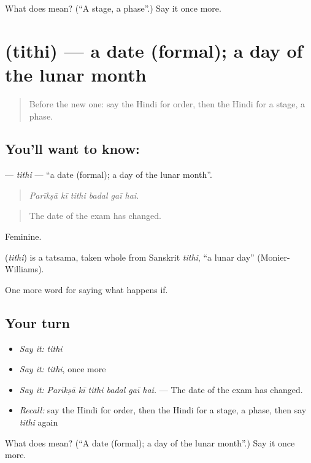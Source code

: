 \begin{tcolorbox}[breakable,colback=teal!4,colframe=teal!35!black,title={Before you move on}]
What does  mean? (\textquotedblleft{}A stage, a phase\textquotedblright{}.) Say it once more.
\end{tcolorbox}
\section[\texorpdfstring{\hi{तिथि} (tithi)}{तिथि (tithi)}]{ (tithi) — a date (formal); a day of the lunar month}

\label{lesson:HI-C553-tithi}



\begin{quote}
Before the new one: say the Hindi for order, then the Hindi for a stage, a phase.
\end{quote}

\subsection*{You'll want to know: }
\textbf{} — \emph{tithi} — \textquotedblleft{}a date (formal); a day of the lunar month\textquotedblright{}.

\begin{quote}
     
\end{quote}

\begin{quote}
\emph{Parīkṣā kī tithi badal gaī hai.}
\end{quote}

\begin{quote}
The date of the exam has changed.
\end{quote}

Feminine.

\begin{cousinweb}
\textbf{} (\emph{tithi}) is a tatsama, taken whole from Sanskrit \emph{tithi}, \textquotedblleft{}a lunar day\textquotedblright{} (Monier-Williams).
\end{cousinweb}

\begin{grammarlens}[title={What you've built}]
One more word for saying what happens if.
\end{grammarlens}

\subsection*{Your turn}
\begin{itemize}
\raggedright
  \item \emph{Say it:} \emph{tithi}
  \item \emph{Say it:} \emph{tithi}, once more
  \item \emph{Say it:} \emph{Parīkṣā kī tithi badal gaī hai.} — The date of the exam has changed.
  \item \emph{Recall:} say the Hindi for order, then the Hindi for a stage, a phase, then say \emph{tithi} again
\end{itemize}

\begin{tcolorbox}[breakable,colback=teal!4,colframe=teal!35!black,title={Before you move on}]
What does  mean? (\textquotedblleft{}A date (formal); a day of the lunar month\textquotedblright{}.) Say it once more.
\end{tcolorbox}

